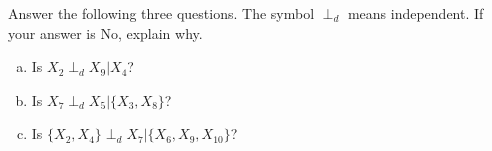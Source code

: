 \documentclass[11pt]{article}
\begin{document}
Answer the following three questions. The symbol $\perp_d$ means independent. If your answer is No, explain why. 
\begin{enumerate}[(a)]
    \item Is $X_2 \perp_d X_9 | X_4$?
    \item Is $X_7 \perp_d X_5 | \{X_3, X_8 \}$?
    \item Is $ \{X_2, X_4\} \perp_d X_7 | \{X_6, X_9, X_{10} \}$?
\end{enumerate}
\end{document}
